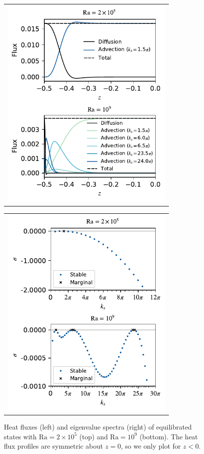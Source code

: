 \documentclass[reprint,amsmath,amssymb,aps,nofootinbib]{revtex4-1}
\newcommand\Ra{\mathrm{Ra}}
\begin{document}
\begin{figure}
    \centering
    \begin{tabular}{@{}c@{}}
        \includegraphics[width=3.375in]{flux_sup_n.pdf}
    \end{tabular}
    \begin{tabular}{@{}c@{}}
        \includegraphics[width=3.375in]{EV_spectra_2ra.pdf}
    \end{tabular}
    \caption{Heat fluxes (left) and eigenvalue spectra (right) of equilibrated states with $\Ra = 2 \times 10^5$ (top) and $\Ra = 10^9$ (bottom). 
    The heat flux profiles are symmetric about $z=0$, so we only plot for $z<0$.
}
\end{figure}
\end{document}
